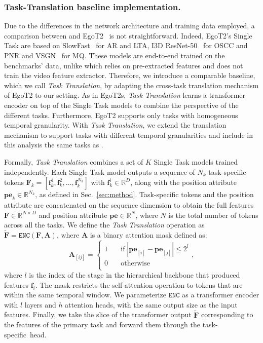 \subsubsection{Task-Translation baseline implementation.}
Due to the differences in the network architecture and training data employed, a comparison between \ours and EgoT2~\cite{egot2} is not straightforward.
Indeed, EgoT2's Single Task are based on SlowFast~\cite{slowfast} for AR and LTA, I3D ResNet-50~\cite{carreira2017quo} for OSCC and PNR and VSGN~\cite{zhao2021video} for MQ.
These models are end-to-end trained on the benchmarks' data, unlike \ours which relies on pre-extracted features and does not train the video feature extractor.
Therefore, we introduce a comparable baseline, which we call \emph{Task Translation}, by adapting the cross-task translation mechanism of EgoT2 to our setting.
As in EgoT2s, \emph{Task Translation} learns a transformer encoder on top of the Single Task models to combine the perspective of the different tasks.
Furthermore, EgoT2 supports only tasks with homogeneous temporal granularity.
With \emph{Task Translation}, we extend the translation mechanism to support tasks with different temporal granularities and include in this analysis the same tasks as \ours.

Formally, \emph{Task Translation} combines a set of $K$ Single Task models trained independently.
Each Single Task model outputs a sequence of $N_k$ task-specific tokens $\mathbf{F}_{k} = [\mathbf{f}^{1}_k, \mathbf{f}^{2}_k, \dots, \mathbf{f}^{N_k}_{k}]$ with $\mathbf{f}^{i}_{k} \in \mathbb{R}^{D}$, along with the position attribute $\mathbf{pe}_{k}\in\mathbb{R}^{N_k}$, as defined in Sec.~\ref{sec:method}.
Task-specific tokens and the position attribute are concatenated on the sequence dimension to obtain the full features $\mathbf{F} \in \mathbb{R}^{N \times D}$ and position attribute $\mathbf{pe} \in \mathbb{R}^{N}$, where $N$ is the total number of tokens across all the tasks. We define the \emph{Task Translation} operation as $\tilde{\mathbf{F}} = \mathtt{ENC}(\mathbf{F}, \mathbf{A})$, where $\mathbf{A}$ is a binary attention mask defined as:
\begin{equation}
    \mathbf{A}_{[ij]} = \begin{cases}
        1 & \quad\text{if}\;\left| \mathbf{pe}_{[i]} - \mathbf{pe}_{[j]} \right| \le 2^{l} \\
        0 & \quad\text{otherwise}                                                          \\
    \end{cases},
\end{equation}
where $l$ is the index of the stage in the hierarchical backbone that produced features $\mathbf{f}_i$. The mask restricts the self-attention operation to tokens that are within the same temporal window.
We parameterize $\mathtt{ENC}$ as a transformer encoder with $l$ layers and $h$ attention heads, with the same output size as the input features.
Finally, we take the slice of the transformer output $\tilde{\mathbf{F}}$ corresponding to the features of the primary task and forward them through the task-specific~head.



